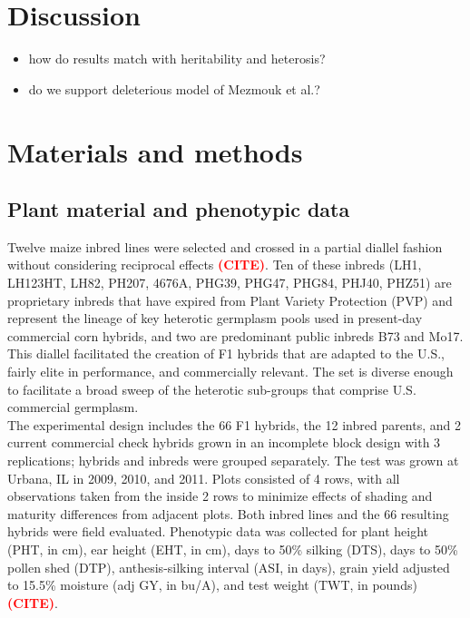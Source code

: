 \documentclass[10pt]{article}
\newcommand{\sme}[1]{\textcolor{red}{\bf #1}}
\begin{document}
\section*{Discussion}


\begin{itemize}
  \item how do results match with heritability and heterosis?
  \item do we support deleterious model of Mezmouk et al.?
\end{itemize}




\section*{Materials and methods}

\subsection*{Plant material and phenotypic data}
Twelve maize inbred lines were selected and crossed in a partial diallel fashion without considering reciprocal effects \sme{(CITE)}. Ten of these inbreds (LH1, LH123HT, LH82, PH207, 4676A, PHG39, PHG47, PHG84, PHJ40, PHZ51) are proprietary inbreds that have expired from Plant Variety Protection (PVP) and represent the lineage of key heterotic germplasm pools used in present-day commercial corn hybrids, and two are predominant public inbreds B73 and Mo17. This diallel facilitated the creation of F1 hybrids that are adapted to the U.S., fairly elite in performance, and commercially relevant. The set is diverse enough to facilitate a broad sweep of the heterotic sub-groups that comprise U.S. commercial germplasm. \\

The experimental design includes the 66 F1 hybrids, the 12 inbred parents, and 2 current commercial check hybrids grown in an incomplete block design with 3 replications; hybrids and inbreds were grouped separately. The test was grown at Urbana, IL in 2009, 2010, and 2011.  Plots consisted of 4 rows, with all observations taken from the inside 2 rows to minimize effects of shading and maturity differences from adjacent plots. Both inbred lines and the 66 resulting hybrids were field evaluated. Phenotypic data was collected for plant height (PHT, in cm), ear height (EHT, in cm), days to 50\% silking (DTS), days to 50\% pollen shed (DTP), anthesis-silking interval (ASI, in days), grain yield adjusted to 15.5\% moisture (adj GY, in bu/A), and test weight (TWT, in pounds) \sme{(CITE)}.%
\end{document}
